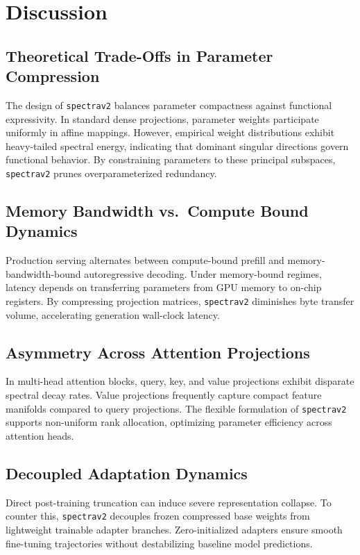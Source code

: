 \section{Discussion}

\subsection{Theoretical Trade-Offs in Parameter Compression}
The design of \texttt{spectrav2} balances parameter compactness against functional expressivity. In standard dense projections, parameter weights participate uniformly in affine mappings. However, empirical weight distributions exhibit heavy-tailed spectral energy, indicating that dominant singular directions govern functional behavior. By constraining parameters to these principal subspaces, \texttt{spectrav2} prunes overparameterized redundancy.

\subsection{Memory Bandwidth vs.\ Compute Bound Dynamics}
Production serving alternates between compute-bound prefill and memory-bandwidth-bound autoregressive decoding. Under memory-bound regimes, latency depends on transferring parameters from GPU memory to on-chip registers. By compressing projection matrices, \texttt{spectrav2} diminishes byte transfer volume, accelerating generation wall-clock latency.

\subsection{Asymmetry Across Attention Projections}
In multi-head attention blocks, query, key, and value projections exhibit disparate spectral decay rates. Value projections frequently capture compact feature manifolds compared to query projections. The flexible formulation of \texttt{spectrav2} supports non-uniform rank allocation, optimizing parameter efficiency across attention heads.

\subsection{Decoupled Adaptation Dynamics}
Direct post-training truncation can induce severe representation collapse. To counter this, \texttt{spectrav2} decouples frozen compressed base weights from lightweight trainable adapter branches. Zero-initialized adapters ensure smooth fine-tuning trajectories without destabilizing baseline model predictions.

